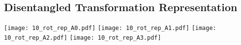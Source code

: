 \documentclass[twocolumn]{svjour3}
\begin{document}

\subsection{Disentangled Transformation Representation}
\label{sec:untangle}

\begin{figure*}[t]
\texttt{[image: 10\_rot\_rep\_A0.pdf]}%
\hfill
\texttt{[image: 10\_rot\_rep\_A1.pdf]}%
\hfill
\texttt{[image: 10\_rot\_rep\_A2.pdf]}%
\hfill
\texttt{[image: 10\_rot\_rep\_A3.pdf]}%


\end{figure*}
\end{document}
